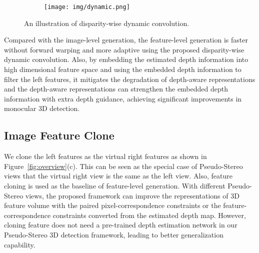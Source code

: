 \documentclass[10pt,twocolumn,letterpaper]{article}
\begin{document}
\begin{figure}[t!]
    \centering
    \begin{subfigure}{\columnwidth}
        \texttt{[image: img/dynamic.png]}
    \end{subfigure}
    \vspace{-3mm}
    \caption{\small An illustration of disparity-wise dynamic convolution.}
    \label{fig:conv}
    \vspace{-3mm}
\end{figure}
Compared with the image-level generation, the feature-level generation is faster without forward warping and more adaptive using the proposed disparity-wise dynamic convolution.
Also, by embedding the estimated depth information into high dimensional feature space and using the embedded depth information to filter the left features, it mitigates the degradation of depth-aware representations and the depth-aware representations can strengthen the embedded depth information with extra depth guidance, achieving significant improvements in monocular 3D detection. 

\subsection{Image Feature Clone}\label{sec:img}
\vspace{-1mm}
We clone the left features as the virtual right features as shown in Figure~\ref{fig:overview}(c). This can be seen as the special case of Pseudo-Stereo views that the virtual right view is the same as the left view. Also, feature cloning is used as the baseline of feature-level generation. With different Pseudo-Stereo views, the proposed framework can improve the representations of 3D feature volume with the paired pixel-correspondence constraints or the feature-correspondence constraints converted from the estimated depth map. However, cloning feature does not need a pre-trained depth estimation network in our Pseudo-Stereo 3D detection framework, leading to better generalization capability.   
\end{document}
